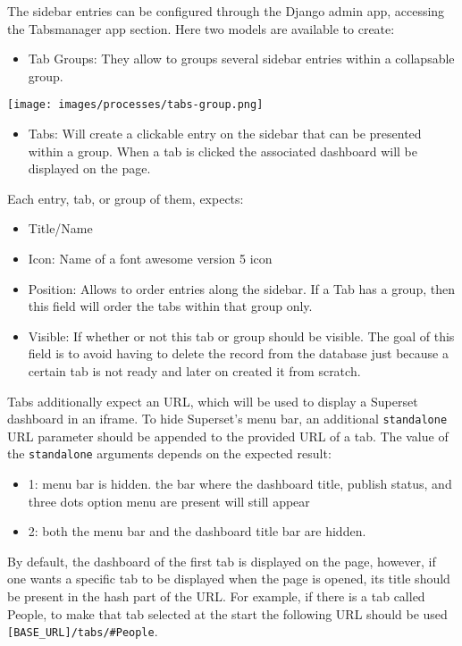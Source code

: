 \documentclass[
]{book}
\providecommand{\tightlist}{%
  \setlength{\itemsep}{0pt}\setlength{\parskip}{0pt}}
\begin{document}
The sidebar entries can be configured through the Django admin app, accessing the Tabsmanager app section.
Here two models are available to create:

\begin{itemize}
\tightlist
\item
  Tab Groups: They allow to groups several sidebar entries within a collapsable group.
\end{itemize}

\texttt{[image: images/processes/tabs-group.png]}

\begin{itemize}
\tightlist
\item
  Tabs: Will create a clickable entry on the sidebar that can be presented within a group. When a tab is clicked the associated dashboard will be displayed on the page.
\end{itemize}

Each entry, tab, or group of them, expects:

\begin{itemize}
\tightlist
\item
  Title/Name
\item
  Icon: Name of a font awesome version 5 icon
\item
  Position: Allows to order entries along the sidebar. If a Tab has a group, then this field will order the tabs within that group only.
\item
  Visible: If whether or not this tab or group should be visible. The goal of this field is to avoid having to delete the record from the database just because a certain tab is not ready and later on created it from scratch.
\end{itemize}

Tabs additionally expect an URL, which will be used to display a Superset dashboard in an iframe.
To hide Superset's menu bar, an additional \texttt{standalone} URL parameter should be appended to the provided URL of a tab.
The value of the \texttt{standalone} arguments depends on the expected result:

\begin{itemize}
\tightlist
\item
  1: menu bar is hidden. the bar where the dashboard title, publish status, and three dots option menu are present will still appear
\item
  2: both the menu bar and the dashboard title bar are hidden.
\end{itemize}

By default, the dashboard of the first tab is displayed on the page, however, if one wants a specific tab to be displayed when the page is opened, its title should be present in the hash part of the URL.
For example, if there is a tab called People, to make that tab selected at the start the following URL should be used \texttt{{[}BASE\_URL{]}/tabs/\#People}.
\end{document}
